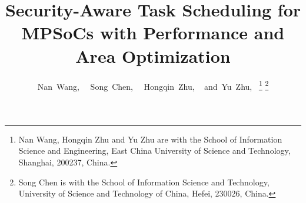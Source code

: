 \documentclass[10pt,journal]{IEEEtran}
\begin{document}
%
\title{Security-Aware Task Scheduling for MPSoCs with Performance and Area Optimization}
%
%
%
%

\author{Nan~Wang,~
        ~Song~Chen,~
        ~Hongqin~Zhu, ~
        and~Yu~Zhu,~
\thanks{Nan Wang, Hongqin Zhu and Yu Zhu are with the School of Information Science and Engineering, East China University of Science and Technology, Shanghai, 200237, China.}%
\thanks{Song Chen is with the School of Information Science and Technology, University of Science and Technology of China, Hefei, 230026, China.}
}
\end{document}
